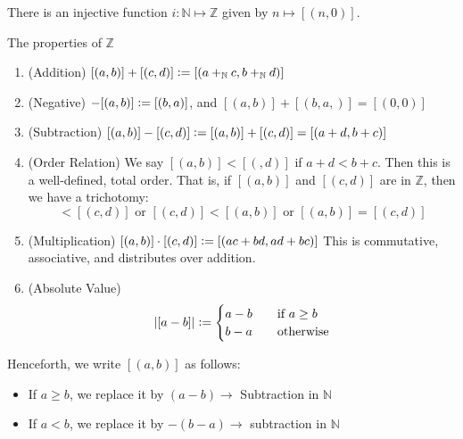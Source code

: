 \documentclass[12pt]{amsart}
\newcommand{\bbN}{\mathbb{N}}
\newcommand{\bbZ}{\mathbb{Z}}
\theoremstyle{plain}
\theoremstyle{remark}
\theoremstyle{definition}
\begin{document}
\par
There is an injective function $i:\bbN \mapsto \bbZ$ given by $n \mapsto [(n,0)]$.

\hfill
\par
The properties of $\bbZ$
\begin{enumerate}[(1)]
	\item (Addition)
		$[(a,b)] + [(c,d)] \vcentcolon = [(a +_{\bbN} c, b +_{\bbN} d)]$ 
	\item (Negative)
		$-[(a,b)] \vcentcolon = [(b,a)]$, and $[(a,b)] + [(b,a,)] = [(0,0)]$
	\item (Subtraction)
		$[(a,b)] - [(c,d)] \vcentcolon = [(a,b)] + [(c,d)] = [(a+d,b+c)]$
	\item (Order Relation)
		We say $[(a,b)] < [(,d)]$ if $a + d < b + c$. Then this is a well-defined, total order. That is, if $[(a,b)]$ and $[(c,d)]$ are in $\bbZ$, then we have a trichotomy:
		\begin{equation*}
			[(a,b)] < [(c,d)] \mbox{ or } [(c,d)] < [(a,b)] \mbox{ or } [(a,b)] = [(c,d)]
		\end{equation*}

	\item (Multiplication)
		$[(a,b)] \cdot [(c,d)] \vcentcolon = [(ac+bd, ad + bc)]$
		\newline
		This is commutative, associative, and distributes over addition.
	\item (Absolute Value)
		\begin{equation*}
			|[a - b]| \vcentcolon = 
			\begin{cases}
				a - b \quad &\mbox{if } a \geq b\\
				b - a \quad &\mbox{otherwise}
			\end{cases}
		\end{equation*}
\end{enumerate}
Henceforth, we write $[(a,b)]$ as follows:
\begin{itemize}[-]
	\item
		If $a \geq b$, we replace it by $(a - b) \rightarrow$ Subtraction in $\bbN$
	\item
		If $a < b$, we replace it by $-(b - a ) \rightarrow$  subtraction in $\bbN$
\end{itemize}
\end{document}
